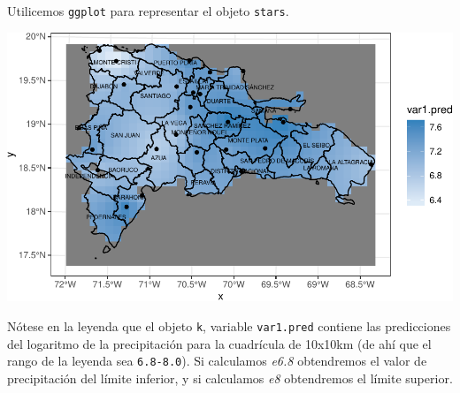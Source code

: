 \documentclass[11pt,]{article}
\newenvironment{Shaded}{\begin{snugshade}}{\end{snugshade}}
\newcommand{\KeywordTok}[1]{\textcolor[rgb]{0.13,0.29,0.53}{\textbf{#1}}}
\newcommand{\DataTypeTok}[1]{\textcolor[rgb]{0.13,0.29,0.53}{#1}}
\newcommand{\DecValTok}[1]{\textcolor[rgb]{0.00,0.00,0.81}{#1}}
\newcommand{\StringTok}[1]{\textcolor[rgb]{0.31,0.60,0.02}{#1}}
\newcommand{\OperatorTok}[1]{\textcolor[rgb]{0.81,0.36,0.00}{\textbf{#1}}}
\newcommand{\NormalTok}[1]{#1}
\begin{document}
Utilicemos \texttt{ggplot} para representar el objeto \texttt{stars}.

\begin{Shaded}
\end{Shaded}

\includegraphics{Proyecto-Precipitaciones_files/figure-latex/krige-log-1.pdf}

Nótese en la leyenda que el objeto \texttt{k}, variable
\texttt{var1.pred} contiene las predicciones del logaritmo de la
precipitación para la cuadrícula de 10x10km (de ahí que el rango de la
leyenda sea \texttt{6.8-8.0}). Si calculamos \emph{e6.8} obtendremos el
valor de precipitación del límite inferior, y si calculamos \emph{e8}
obtendremos el límite superior.
\end{document}
